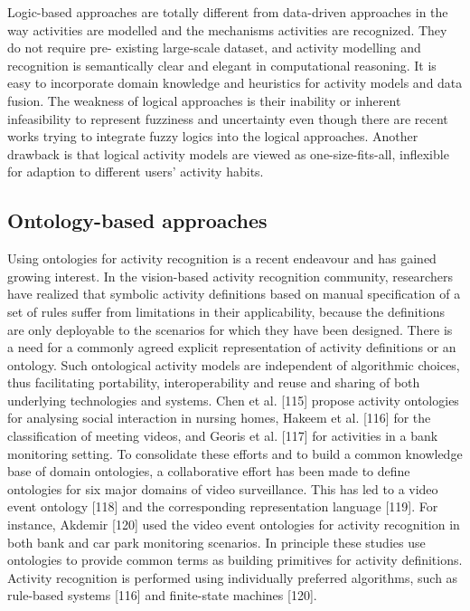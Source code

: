 Logic-based approaches are totally different from data-driven approaches in the way activities are modelled and the mechanisms activities are recognized. They do not require pre- existing large-scale dataset, and activity modelling and recognition is semantically clear and elegant in computational reasoning. It is easy to incorporate domain knowledge and heuristics for activity models and data fusion. The weakness of logical approaches is their inability or inherent infeasibility to represent fuzziness and uncertainty even though there are recent works trying to integrate fuzzy logics into the logical approaches. Another drawback is that logical activity models are viewed as one-size-fits-all, inflexible for adaption to different users’ activity habits.

\subsection{Ontology-based approaches}

Using ontologies for activity recognition is a recent endeavour and has gained growing interest. In the vision-based activity recognition community, researchers have realized that symbolic activity definitions based on manual specification of a set of rules suffer from limitations in their applicability, because the definitions are only deployable to the scenarios for which they have been designed. There is a need for a commonly agreed explicit representation of activity definitions or an ontology. Such ontological activity models are independent of algorithmic choices, thus facilitating portability, interoperability and reuse and sharing of both underlying technologies and systems. Chen et al. [115] propose activity ontologies for analysing social interaction in nursing homes, Hakeem et al. [116] for the classification of meeting videos, and Georis et al. [117] for activities in a bank monitoring setting. To consolidate these efforts and to build a common knowledge base of domain ontologies, a collaborative effort has been made to define ontologies for six major domains of video surveillance. This has led to a video event ontology [118] and the corresponding representation language [119]. For instance, Akdemir [120] used the video event ontologies for activity recognition in both bank and car park monitoring scenarios. In principle these studies use ontologies to provide common terms as building primitives for activity definitions. Activity recognition is performed using individually preferred algorithms, such as rule-based systems [116] and finite-state machines [120]. 

